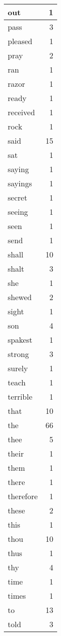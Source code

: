 \begin{center}
\begin{longtable}{l|r}
out & 1\\ \hline 
pass & 3\\ \hline 
pleased & 1\\ \hline 
pray & 2\\ \hline 
ran & 1\\ \hline 
razor & 1\\ \hline 
ready & 1\\ \hline 
received & 1\\ \hline 
rock & 1\\ \hline 
said & 15\\ \hline 
sat & 1\\ \hline 
saying & 1\\ \hline 
sayings & 1\\ \hline 
secret & 1\\ \hline 
seeing & 1\\ \hline 
seen & 1\\ \hline 
send & 1\\ \hline 
shall & 10\\ \hline 
shalt & 3\\ \hline 
she & 1\\ \hline 
shewed & 2\\ \hline 
sight & 1\\ \hline 
son & 4\\ \hline 
spakest & 1\\ \hline 
strong & 3\\ \hline 
surely & 1\\ \hline 
teach & 1\\ \hline 
terrible & 1\\ \hline 
that & 10\\ \hline 
the & 66\\ \hline 
thee & 5\\ \hline 
their & 1\\ \hline 
them & 1\\ \hline 
there & 1\\ \hline 
therefore & 1\\ \hline 
these & 2\\ \hline 
this & 1\\ \hline 
thou & 10\\ \hline 
thus & 1\\ \hline 
thy & 4\\ \hline 
time & 1\\ \hline 
times & 1\\ \hline 
to & 13\\ \hline 
told & 3\\ \hline 

\end{longtable}
\end{center}
